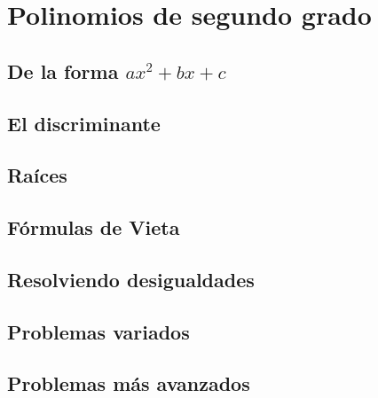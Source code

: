 \chapter{\textbf{Polinomios de segundo grado}}



\section{De la forma $ax^2 + bx + c$}

\section{El discriminante}

\section{Raíces}

\section{Fórmulas de Vieta}

\section{Resolviendo desigualdades}

\section{Problemas variados}

\section{Problemas más avanzados}
